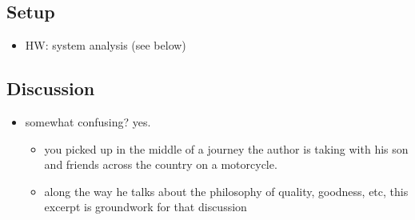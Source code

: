 \documentclass{article}
\begin{document}
\subsection*{Setup}

\begin{itemize}
\item HW: system analysis (see below)
\end{itemize}

\subsection*{Discussion}

\begin{itemize}
\item somewhat confusing? yes.
  \begin{itemize}
  \item you picked up in the middle of a journey the author is taking with his son
    and friends across the country on a motorcycle.
  \item along the way he talks about the philosophy of quality, goodness, etc,
    this excerpt is groundwork for that discussion
  \end{itemize}


\end{itemize}
\end{document}
